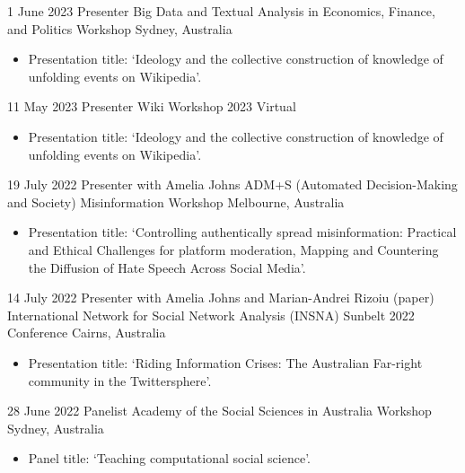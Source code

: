 \documentclass[12pt,a4paper,sans]{moderncv}
\begin{document}
\cventry 
{1 June 2023}
{Presenter}
{Big Data and Textual Analysis in Economics, Finance, and Politics Workshop}
{Sydney, Australia}
{}
      {
      \begin{itemize} %
        \item {Presentation title: `Ideology and the collective construction of knowledge of unfolding events on Wikipedia'.}
      \end{itemize}
    }

\cventry 
{11 May 2023}
{Presenter}
{Wiki Workshop 2023}
{Virtual}
{}
      {
      \begin{itemize} %
        \item {Presentation title: `Ideology and the collective construction of knowledge of unfolding events on Wikipedia'.}
      \end{itemize}
    }
 
\cventry %
{19 July 2022}
{Presenter with Amelia Johns}
{ADM+S (Automated Decision-Making and Society) Misinformation Workshop}
{Melbourne, Australia}
{}
      {
      \begin{itemize} %
        \item {Presentation title: `Controlling authentically spread misinformation: Practical and Ethical
Challenges for platform moderation, Mapping and Countering the Diffusion of Hate Speech Across Social Media'.}
      \end{itemize}
    }

\cventry %
{14 July 2022}
{Presenter with Amelia Johns and Marian-Andrei Rizoiu (paper)}
{International Network for Social Network Analysis (INSNA) Sunbelt 2022 Conference}
{Cairns, Australia}
{}
       {
      \begin{itemize} %
        \item {Presentation title: `Riding Information Crises: The
            Australian Far-right community in the Twittersphere'.}
      \end{itemize}
    }

\cventry %
{28 June 2022}
{Panelist}
{Academy of the Social Sciences in Australia Workshop}
{Sydney, Australia}
{}
       {
      \begin{itemize} %
        \item {Panel title: `Teaching computational social science'.}
      \end{itemize}
    }
\end{document}
